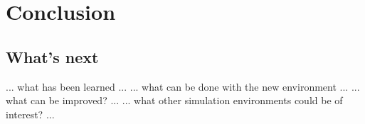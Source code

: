 \chapter{Conclusion}

\section{What's next}
... what has been learned ...
... what can be done with the new environment ...
... what can be improved? ...
... what other simulation environments could be of interest? ...